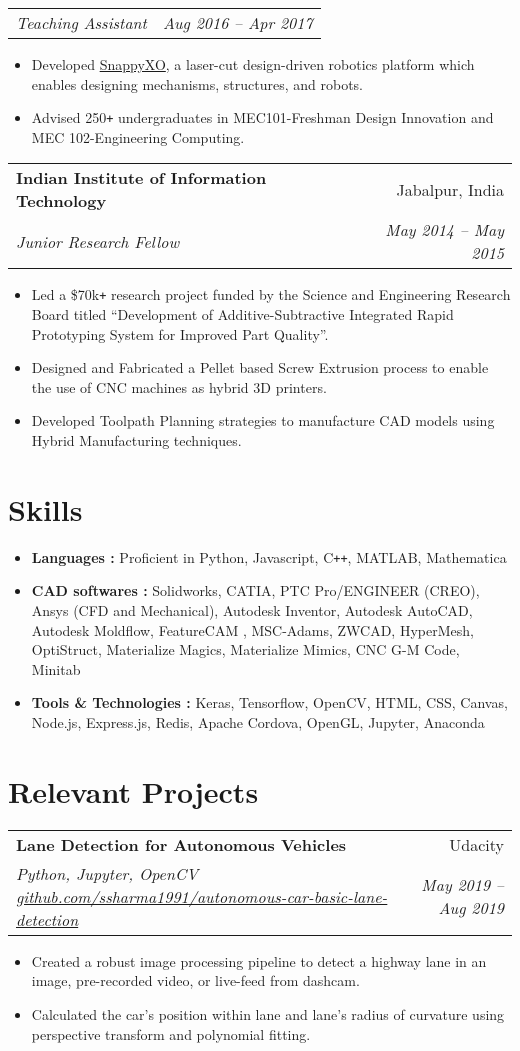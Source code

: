 \documentclass[letterpaper,10pt]{article}
\makeatletter
\newcommand{\resumeHeading}[4]{
  \vspace{-1pt}
    \begin{tabular*}{0.97\textwidth}{l@{\extracolsep{\fill}}r}
      \textbf{#1} & #2 \vspace{-2pt}\\ \vspace{1pt}
      \textit{\small#3} & \textit{\small #4} \\
    \end{tabular*}
}
\newcommand{\resumeSubheadingWithDate}[2]{
    \begin{tabular*}{0.97\textwidth}{l@{\extracolsep{\fill}}r}
      \textit{\small#1} & \textit{\small #2}\\
    \end{tabular*}
    \vspace{+2pt}
}
\newcommand{\resumeSection}[1]{
\vspace{-12pt}
\section{\textbf{#1}}
}
\newcommand{\resumeItemListStart}{
\vspace{-7pt}
\begin{itemize}[leftmargin=14pt]
}
\newcommand{\resumeItemListEnd}{
\vspace{+7pt}
\end{itemize}
}
\newcommand{\resumeItem}[1]{
  \item\small{
      {#1 \vspace{-7pt}
      }
  }
}
\makeatother
\begin{document}
      \vspace{-5pt}
      \resumeSubheadingWithDate{Teaching Assistant}{Aug 2016 -- Apr 2017}
      \resumeItemListStart
      	\resumeItem{Developed \href{http://snappyxo.com/}{SnappyXO}, a laser-cut design-driven robotics platform which enables designing mechanisms, structures, and robots.}
      	\resumeItem{Advised 250\texttt{+} undergraduates in MEC101-Freshman Design Innovation and MEC 102-Engineering Computing.}
      \resumeItemListEnd
      
      \resumeHeading
      {Indian Institute of Information Technology}{Jabalpur, India}
      {Junior Research Fellow}{May 2014 -- May 2015}
      \resumeItemListStart
      	\resumeItem{Led a \$70k\texttt{+} research project funded by the Science and Engineering Research Board titled “Development of Additive-Subtractive Integrated Rapid Prototyping System for Improved Part Quality”.}
      	\resumeItem{Designed and Fabricated a Pellet based Screw Extrusion process to enable the use of CNC machines as hybrid 3D printers.}
      	\resumeItem{Developed Toolpath Planning strategies to manufacture CAD models using Hybrid Manufacturing techniques.}
      \resumeItemListEnd
      

\resumeSection{Skills}
\vspace{+7pt}
    \resumeItemListStart
      \resumeItem{\textbf{Languages :} Proficient in Python, Javascript, C\texttt{++}, MATLAB, Mathematica}
      \resumeItem{\textbf{CAD softwares :} Solidworks, CATIA, PTC Pro/ENGINEER (CREO), Ansys (CFD and Mechanical), Autodesk Inventor, Autodesk AutoCAD, Autodesk Moldflow, FeatureCAM , MSC-Adams, ZWCAD, HyperMesh, OptiStruct, Materialize Magics, Materialize Mimics, CNC G-M Code, Minitab}
      \resumeItem{\textbf{Tools \& Technologies :} Keras, Tensorflow, OpenCV, HTML, CSS, Canvas, Node.js, Express.js, Redis, Apache Cordova, OpenGL, Jupyter, Anaconda}
    \resumeItemListEnd


    \resumeSection{Relevant Projects}
    
    \resumeHeading{Lane Detection for Autonomous Vehicles}{Udacity}{Python, Jupyter, OpenCV \href{https://github.com/ssharma1991/autonomous-car-basic-lane-detection}{github.com/ssharma1991/autonomous-car-basic-lane-detection}}{May 2019 -- Aug 2019}
    \resumeItemListStart
    	\resumeItem{Created a robust image processing pipeline to detect a highway lane in an image, pre-recorded video, or live-feed from dashcam.}
    	\resumeItem{Calculated the car's position within lane and lane's radius of curvature using perspective transform and polynomial fitting.}
    \resumeItemListEnd
\end{document}
